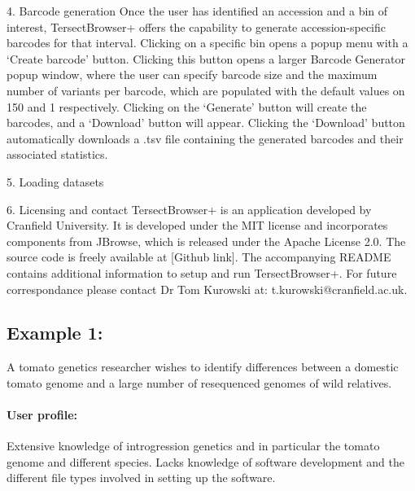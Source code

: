 \documentclass[12pt]{article}
\begin{document}
4. Barcode generation
Once the user has identified an accession and a bin of interest, TersectBrowser+ offers the capability to generate accession-specific barcodes for that interval. Clicking on a specific bin opens a popup menu with a `Create barcode' button. Clicking this button opens a larger Barcode Generator popup window, where the user can specify barcode size and the maximum number of variants per barcode, which are populated with the default values on 150 and 1 respectively. Clicking on the `Generate' button will create the barcodes, and a `Download' button will appear. Clicking the `Download' button automatically downloads a .tsv file containing the generated barcodes and their associated statistics.

5. Loading datasets

6. Licensing and contact
TersectBrowser+ is an application developed by Cranfield University. It is developed under the MIT license and incorporates components from JBrowse, which is released under the Apache License 2.0. The source code is freely available at [Github link]. The accompanying README contains additional information to setup and run TersectBrowser+. For future correspondance please contact Dr Tom Kurowski at: t.kurowski@cranfield.ac.uk.

\subsection{Example 1:} A tomato genetics researcher wishes to identify differences between a domestic tomato genome and a large number of resequenced genomes of wild relatives. 

\paragraph{User profile:} Extensive knowledge of introgression genetics and in particular the tomato genome and different species. Lacks knowledge of software development and the different file types involved in setting up the software. 
\end{document}
